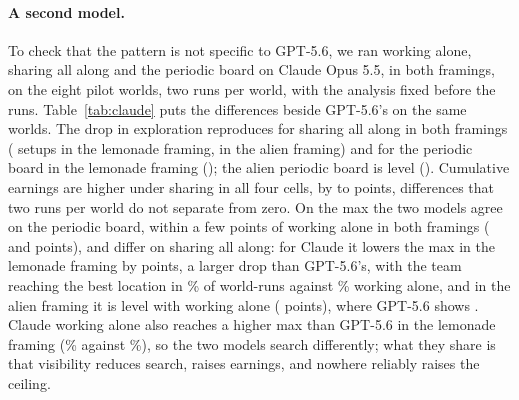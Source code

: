 \paragraph{A second model.}
To check that the pattern is not specific to GPT-5.6, we ran working alone, sharing all along and the
periodic board on Claude Opus 5.5, in both framings, on the eight pilot worlds, two runs per world, with the
analysis fixed before the runs. Table~\ref{tab:claude} puts the differences beside GPT-5.6's on the same
worlds. The drop in exploration reproduces for sharing all along in both framings (\CLemUniqShare{} setups in
the lemonade framing, \CAliUniqShare{} in the alien framing) and for the periodic board in the lemonade framing
(\CLemUniqPeriodic{}); the alien periodic board is level (\CAliUniqPeriodic{}). Cumulative earnings are higher
under sharing in all four cells, by \CLemSumShare{} to \CAliSumShare{} points, differences that two runs per
world do not separate from zero. On the max the two models agree on the periodic board, within a few points of
working alone in both framings (\CLemMaxPeriodic{} and \CAliMaxPeriodic{} points), and differ on sharing all
along: for Claude it lowers the max in the lemonade framing by \CLemMaxShare{} points, a larger drop than
GPT-5.6's, with the team reaching the best location in \CLemReachedShareArm\% of world-runs against
\CLemReachedShareSolo\% working alone, and in the alien framing it is level with working alone
(\CAliMaxShare{} points), where GPT-5.6 shows \GAliMaxShare{}. Claude working alone also reaches a higher max
than GPT-5.6 in the lemonade framing (\CLemMaxShareSolo\% against \LemSoloMax\%), so the two models search
differently; what they share is that visibility reduces search, raises earnings, and nowhere reliably raises
the ceiling.

\begin{table}[t]
  \centering
  \caption{Claude Opus 5.5 reproduces the drop in exploration under sharing all along and the direction of the earnings gain; the drop in the max appears in the lemonade framing only. Each sharing condition's difference from working alone, paired over the eight pilot worlds, for Claude Opus 5.5 (two runs per world) and GPT-5.6 (two or three runs per world) on the same worlds. Max and cumulative earnings in percentage points of the optimum; distinct setups in counts. $^{\ast}$ marks $p<0.05$ on the exact sign-flip test.}
  \label{tab:claude}
  \scriptsize
  \setlength{\tabcolsep}{3pt}
  
\end{table}

